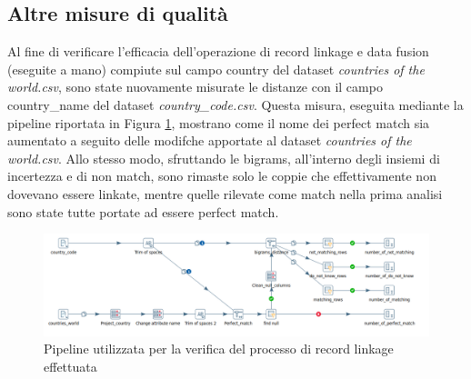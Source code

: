 \subsection{Altre misure di qualità}
Al fine di verificare l'efficacia dell'operazione di record linkage e data fusion (eseguite a mano) compiute sul campo country del dataset \textit{countries of the world.csv}, sono state nuovamente misurate le distanze con il campo country\_name del dataset \textit{country\_code.csv}. Questa misura, eseguita mediante la pipeline riportata in Figura \ref{fig:qdtrecordlinkage}, mostrano come il nome dei perfect match sia aumentato a seguito delle modifche apportate al dataset \textit{countries of the world.csv}. Allo stesso modo, sfruttando le bigrams, all'interno degli insiemi di incertezza e di non match, sono rimaste solo le coppie che effettivamente non dovevano essere linkate, mentre quelle rilevate come match nella prima analisi sono state tutte portate ad essere perfect match.

\begin{figure}[h!]
	\centering
	\includegraphics[width=1\linewidth]{images/QDT_recordlinkage}
	\caption{Pipeline utilizzata per la verifica del processo di record linkage effettuata}
	\label{fig:qdtrecordlinkage}
\end{figure}

